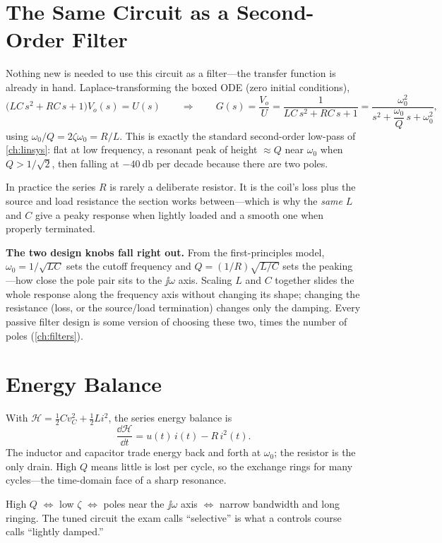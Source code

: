 \section{The Same Circuit as a Second-Order Filter}
\label{sec:lc-lowpass}
Nothing new is needed to use this circuit as a filter---the transfer function is
already in hand. Laplace-transforming the boxed ODE (zero initial conditions),
\[
\bigl(LC\,s^2+RC\,s+1\bigr)V_o(s)=U(s)
\qquad\Longrightarrow\qquad
G(s)=\frac{V_o}{U}=\frac{1}{LC\,s^2+RC\,s+1}
=\frac{\omega_0^2}{s^2+\dfrac{\omega_0}{Q}\,s+\omega_0^2},
\]
using \(\omega_0/Q=2\zeta\omega_0=R/L\). This is exactly the standard second-order
low-pass of \cref{ch:linsys}: flat at low frequency, a resonant peak of height
\(\approx Q\) near \(\omega_0\) when \(Q>1/\sqrt2\), then falling at
\(-\SI{40}{\decibel}\) per decade because there are two poles.

In practice the series \(R\) is rarely a deliberate resistor. It is the coil's loss
plus the source and load resistance the section works between---which is why the
\emph{same} \(L\) and \(C\) give a peaky response when lightly loaded and a smooth
one when properly terminated.

\begin{controlsbox}
\textbf{The two design knobs fall right out.} From the first-principles model,
\(\omega_0=1/\sqrt{LC}\) sets the cutoff frequency and
\(Q=(1/R)\sqrt{L/C}\) sets the peaking---how close the pole pair sits to the
\(\jj\omega\) axis. Scaling \(L\) and \(C\) together slides the whole response
along the frequency axis without changing its shape; changing the resistance
(loss, or the source/load termination) changes only the damping. Every passive
filter design is some version of choosing these two, times the number of poles
(\cref{ch:filters}).
\end{controlsbox}

\section{Energy Balance}
With \(\mathcal{H}=\tfrac12 Cv_C^2+\tfrac12 Li^2\), the series energy balance is
\[
\frac{\dd\mathcal{H}}{\dd t}=u(t)\,i(t)-R\,i^2(t).
\]
The inductor and capacitor trade energy back and forth at \(\omega_0\); the
resistor is the only drain. High \(Q\) means little is lost per cycle, so the
exchange rings for many cycles---the time-domain face of a sharp resonance.

\begin{controlsbox}
High \(Q\) \(\Leftrightarrow\) low \(\zeta\) \(\Leftrightarrow\) poles near the
\(\jj\omega\) axis \(\Leftrightarrow\) narrow bandwidth and long ringing. The tuned
circuit the exam calls ``selective'' is what a controls course calls ``lightly
damped.''
\end{controlsbox}

